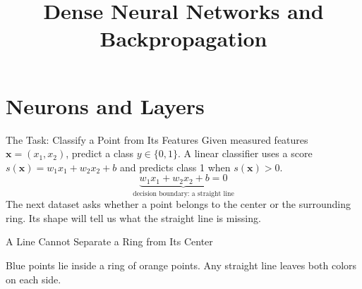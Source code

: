 \documentclass{ntuabeamer}
\title{Dense Neural Networks and Backpropagation}
\author{}
\date{}
\begin{document}
\begin{frame}[plain]
  \makepresentationtitle
\end{frame}


\section{Neurons and Layers}

\begin{frame}{The Task: Classify a Point from Its Features}
  Given measured features $\mathbf x=(x_1,x_2)$, predict a class $y\in\{0,1\}$.
  A linear classifier uses a score $s(\mathbf x)=w_1x_1+w_2x_2+b$ and predicts class 1 when $s(\mathbf x)>0$.
  \[
    \underbrace{w_1x_1+w_2x_2+b=0}_{\text{decision boundary: a straight line}}
  \]
  The next dataset asks whether a point belongs to the center or the surrounding ring. Its shape will tell us what the straight line is missing.
\end{frame}

\begin{frame}{A Line Cannot Separate a Ring from Its Center}
  \centering

  Blue points lie inside a ring of orange points. Any straight line leaves both colors on each side.
\end{frame}
\end{document}
